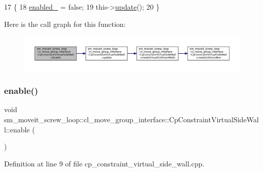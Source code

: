 \begin{DoxyCode}
17         \{
18             \hyperlink{classsm__moveit__screw__loop_1_1cl__move__group__interface_1_1CpConstraintVirtualSideWall_a3ad858929f75175c5c7955b76bb095ec}{enabled\_} = \textcolor{keyword}{false};
19             this->\hyperlink{classsm__moveit__screw__loop_1_1cl__move__group__interface_1_1CpConstraintVirtualSideWall_a4582ad379597080236133d0f354f694e}{update}();
20         \}
\end{DoxyCode}
Here is the call graph for this function\+:
\nopagebreak
\begin{figure}[H]
\begin{center}
\leavevmode
\includegraphics[width=350pt]{classsm__moveit__screw__loop_1_1cl__move__group__interface_1_1CpConstraintVirtualSideWall_a8c41d009be5ef0ab464ed1b0e18138b0_cgraph}
\end{center}
\end{figure}
\mbox{\label{classsm__moveit__screw__loop_1_1cl__move__group__interface_1_1CpConstraintVirtualSideWall_aac2558a634cbcd5d7738011af0d8210b}} 
\subsubsection{\texorpdfstring{enable()}{enable()}}
{\footnotesize\ttfamily void sm\+\_\+moveit\+\_\+screw\+\_\+loop\+::cl\+\_\+move\+\_\+group\+\_\+interface\+::\+Cp\+Constraint\+Virtual\+Side\+Wall\+::enable (\begin{DoxyParamCaption}{ }\end{DoxyParamCaption})}



Definition at line 9 of file cp\+\_\+constraint\+\_\+virtual\+\_\+side\+\_\+wall.\+cpp.



